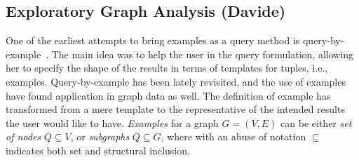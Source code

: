 \subsection{Exploratory Graph Analysis (Davide)} 

One of the earliest attempts to bring examples as a query method is query-by-example~\citep{zloof1975query}.
The main idea was to help the user in the query formulation, allowing her to specify the shape of the results in terms of templates for tuples, i.e., examples.
Query-by-example has been lately revisited, and the use of examples have found application in graph data as well. 
The definition of example has transformed from a mere template to the representative of the intended results the user would like to have.
\emph{Examples} for a graph $G = (V,E)$ can be either \emph{set of nodes} $Q \subseteq V$, or \emph{subgraphs} $Q \subseteq G$, where with an abuse of notation $\subseteq$ indicates both set and structural inclusion. 







